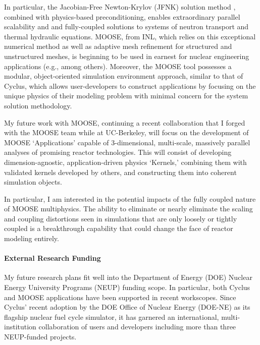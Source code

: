 \documentclass[a4paper, 12pt]{article}
\begin{document}
In particular, the Jacobian-Free Newton-Krylov (JFNK) solution method 
\cite{knoll_jacobian-free_2004}, combined with 
physics-based preconditioning, enables extraordinary parallel scalability and 
and fully-coupled solutions to systems of neutron transport and thermal 
hydraulic equations. MOOSE, from INL, which relies on this exceptional numerical 
method as well as adaptive mesh refinement for structured and 
unstructured meshes, is beginning to be used in earnest for nuclear engineering 
applications (e.g., \cite{park_tightly_2009, short_multiphysics_2013, 
novascone_assessment_2012, novascone_multidimensional_2012, 
gaston_parallel_2009} among others). Moreover, the MOOSE tool possesses a 
modular, object-oriented simulation environment approach, similar to that of 
Cyclus, which allows user-developers to construct applications by focusing on 
the unique physics of their modeling problem  with minimal concern for the 
system solution methodology. 

My future work with MOOSE, continuing a recent collaboration that I forged with the 
MOOSE team while at UC-Berkeley, will focus on the development 
of MOOSE `Applications' capable of 3-dimensional, multi-scale, massively parallel 
analyses of promising reactor technologies. This will consist of developing 
dimension-agnostic, application-driven physics 
`Kernels,' combining them with validated kernels developed by others, and 
constructing them into coherent simulation objects. 

In particular, I am interested in the potential impacts of the fully coupled 
nature of MOOSE multiphysics. The ability to eliminate or nearly eliminate the 
scaling and coupling distortions seen in simulations that are only loosely or 
tightly coupled is a breakthrough capability that could change the face of 
reactor modeling entirely.  

\paragraph{External Research Funding}
My future research plans fit well into the Department of Energy (DOE) Nuclear 
Energy University Programs (NEUP) funding scope. In particular, both Cyclus and 
MOOSE applications have been supported in recent workscopes. Since Cyclus' 
recent adoption by the DOE Office of Nuclear Energy (DOE-NE)  as its flagship 
nuclear fuel cycle simulator, it has garnered an international, 
multi-institution collaboration of users and developers including more than 
three NEUP-funded projects. 
\end{document}
